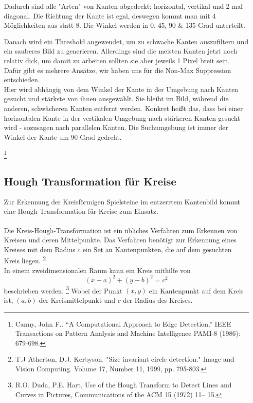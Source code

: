 \documentclass[paper=A4, deutsch]{scrartcl}
\begin{document}
Dadurch sind alle "Arten" von Kanten abgedeckt: horizontal, vertikal und 2 mal diagonal. Die Richtung der Kante ist egal, deswegen kommt man mit 4 Möglichkeiten aus statt 8. Die Winkel werden  in 0, 45, 90 \& 135 Grad unterteilt.

Danach wird ein Threshold angewendet, um zu schwache Kanten auszufiltern und ein sauberes Bild zu generieren. Allerdings sind die meisten Kanten jetzt noch relativ dick, um damit zu arbeiten sollten sie aber jeweils 1 Pixel breit sein. Dafür gibt es mehrere Ansätze, wir haben uns für die Non-Max Suppression entschieden.\\
Hier wird abhängig von dem Winkel der Kante in der Umgebung nach Kanten gesucht und stärkste von ihnen ausgewählt. Sie bleibt im Bild, während die anderen, schwächeren Kanten entfernt werden. Konkret heißt das, dass bei einer horizontalen Kante in der vertikalen Umgebung nach stärkeren Kanten gesucht wird - sozusagen nach parallelen Kanten. Die Suchumgebung ist immer der Winkel der Kante um 90 Grad gedreht. 

\footnote{\label{canny1} Canny, John F.. “A Computational Approach to Edge Detection.” IEEE Transactions on Pattern Analysis and Machine Intelligence PAMI-8 (1986): 679-698.}\\



\subsection{Hough Transformation für Kreise}
Zur Erkennung der Kreisförmigen Spielsteine im entzerrtem Kantenbild kommt eine Hough-Transformation für Kreise zum Einsatz. \\
\\
Die Kreis-Hough-Transformation ist ein übliches Verfahren zum Erkennen von Kreisen und deren Mittelpunkte. Das Verfahren benötigt zur Erkennung eines Kreises mit dem Radius \(c\) ein Set an Kantenpunkten, die auf dem gesuchten Kreis liegen.
	\footnote{\label{houghnote2} T.J Atherton, D.J. Kerbyson. "Size invariant circle detection." Image and Vision Computing. 
	Volume 17, Number 11, 1999, pp. 795-803.}\\
In einem zweidimensionalen Raum kann ein Kreis mithilfe von \\
\begin{equation}
(x - a)^2 +(y - b)^2 = c^2 
\end{equation} 
beschrieben werden. \footnote{\label{houghnote1}R.O. Duda, P.E. Hart, Use of the Hough Transform to Detect Lines and Curves in Pictures, Communications of the ACM 15 (1972) 11– 15.
} Wobei der Punkt \((x,y) \) ein Kantenpunkt auf dem Kreis ist, \((a,b)\) der Kreismittelpunkt und \(c\) der Radius des Kreises.\\
\end{document}
